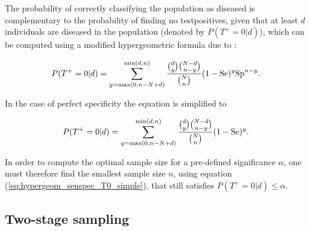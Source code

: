 \documentclass[nojss]{jss}
\begin{document}
The probability of correctly classifying the population as diseased is complementary to the probability of finding no testpositives, given that at least $d$ individuals are diseased in the population (denoted by $P(T^+=0|d)$), which can be computed using a modified hypergeometric formula due to \cite{CaBa98A}:

\begin{equation} \label{eq:hypergeom_senspec_T0}
%
P(T^+=0|d) = \sum_{y = \max(0,n-N+d)}^{\min(d,n)} \frac{{d \choose y}{N-d \choose n-y}}{{N \choose n}} (1-\Se)^y \Sp^{n-y}.
%
\end{equation}

In the case of perfect specificity the equation is simplified to

\begin{equation} \label{eq:hypergeom_senspec_T0_simple}
%
P(T^+=0|d) = \sum_{y = \max(0,n-N+d)}^{\min(d,n)} \frac{{d \choose y}{N-d \choose n-y}}{{N \choose n}} (1-\Se)^y.
%
\end{equation}

In order to compute the optimal sample size  for a pre-defined significance $\alpha$, one must therefore find the smallest sample size $n$, using equation (\ref{eq:hypergeom_senspec_T0_simple}), that still satisfies $P(T^+=0|d)\leq \alpha$.


\subsection{Two-stage sampling} \label{subsec:2-stage-sampling}
\end{document}

